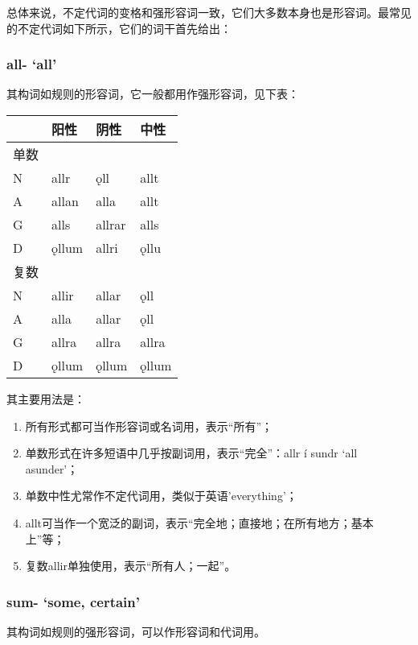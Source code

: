 总体来说，不定代词的变格和强形容词一致，它们大多数本身也是形容词。最常见的不定代词如下所示，它们的词干首先给出：

\subsubsection{all- `all‌'}
其构词如规则的形容词，它一般都用作强形容词，见下表：

\begin{longtable}{llll}
    \toprule
         & 阳性  & 阴性   & 中性  \\
    \midrule
    \endhead
    \bottomrule
    \endfoot
    单数 &       &        &       \\
    N    & allr  & ǫll    & allt  \\
    A    & allan & alla   & allt  \\
    G    & alls  & allrar & alls  \\
    D    & ǫllum & allri  & ǫllu  \\
    复数 &       &        &       \\
    N    & allir & allar  & ǫll   \\
    A    & alla  & allar  & ǫll   \\
    G    & allra & allra  & allra \\
    D    & ǫllum & ǫllum  & ǫllum \\
\end{longtable}

其主要用法是：

\begin{enumerate}
    \item
          所有形式都可当作形容词或名词用，表示``所有''；
    \item
          单数形式在许多短语中几乎按副词用，表示``完全''：allr í sundr `all
          asunder'；
    \item
          单数中性尤常作不定代词用，类似于英语'everything'；
    \item
          allt可当作一个宽泛的副词，表示``完全地；直接地；在所有地方；基本上''等；
    \item
          复数allir单独使用，表示``所有人；一起''。
\end{enumerate}

\subsubsection{sum- `some, certain‌'}

其构词如规则的强形容词，可以作形容词和代词用。

